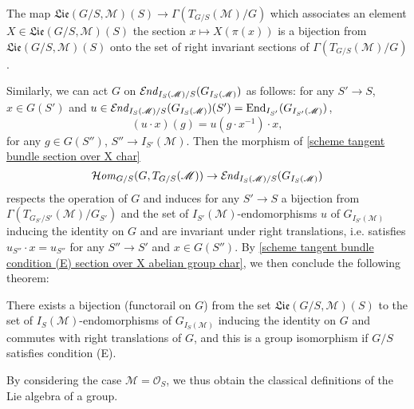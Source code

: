 \begin{proposition}\label{scheme group Lie and right invariant section}
The map $\mathfrak{Lie}(G/S,\mathscr{M})(S)\to\Gamma(T_{G/S}(\mathscr{M})/G)$ which associates an element $X\in\mathfrak{Lie}(G/S,\mathscr{M})(S)$ the section $x\mapsto X(\pi(x))$ is a bijection from $\mathfrak{Lie}(G/S,\mathscr{M})(S)$ onto the set of right invariant sections of $\Gamma(T_{G/S}(\mathscr{M})/G)$.
\end{proposition}

Similarly, we can act $G$ on $\operatorname{\mathcal{E}\hspace*{-1pt}\textit{nd}\hspace{0.5pt}}_{I_S(\mathscr{M})/S}(G_{I_S(\mathscr{M})})$ as follows: for any $S'\to S$, $x\in G(S')$ and $u\in\operatorname{\mathcal{E}\hspace*{-1pt}\textit{nd}\hspace{0.5pt}}_{I_S(\mathscr{M})/S}(G_{I_S(\mathscr{M})})(S')=\mathrm{End}_{I_{S'}}(G_{I_{S'}(\mathscr{M})})$,
\[(u\cdot x)(g)=u(g\cdot x^{-1})\cdot x,\]
for any $g\in G(S'')$, $S''\to I_{S'}(\mathscr{M})$. Then the morphism of \cref{scheme tangent bundle section over X char}
\[\operatorname{\mathcal{H}\hspace*{-0.4pt}\textit{om}\hspace{0.5pt}}_{G/S}(G,T_{G/S}(\mathscr{M}))\to\operatorname{\mathcal{E}\hspace*{-1pt}\textit{nd}\hspace{0.5pt}}_{I_S(\mathscr{M})/S}(G_{I_S(\mathscr{M})})\]
respects the operation of $G$ and induces for any $S'\to S$ a bijection from $\Gamma(T_{G_{S'}/S'}(\mathscr{M})/G_{S'})$ and the set of $I_{S'}(\mathscr{M})$-endomorphisms $u$ of $G_{I_{S'}(\mathscr{M})}$ inducing the identity on $G$ and are invariant under right translations, i.e. satisfies $u_{S''}\cdot x=u_{S''}$ for any $S''\to S'$ and $x\in G(S'')$. By \cref{scheme tangent bundle condition (E) section over X abelian group char}, we then conclude the following theorem:

\begin{proposition}\label{scheme group Lie and right invariant I_S-endomorphism}
There exists a bijection (functorail on $G$) from the set $\mathfrak{Lie}(G/S,\mathscr{M})(S)$ to the set of $I_S(\mathscr{M})$-endomorphisms of $G_{I_S(\mathscr{M})}$ inducing the identity on $G$ and commutes with right translations of $G$, and this is a group isomorphism if $G/S$ satisfies condition (E).
\end{proposition}

By considering the case $\mathscr{M}=\mathscr{O}_S$, we thus obtain the classical definitions of the Lie algebra of a group.\par

